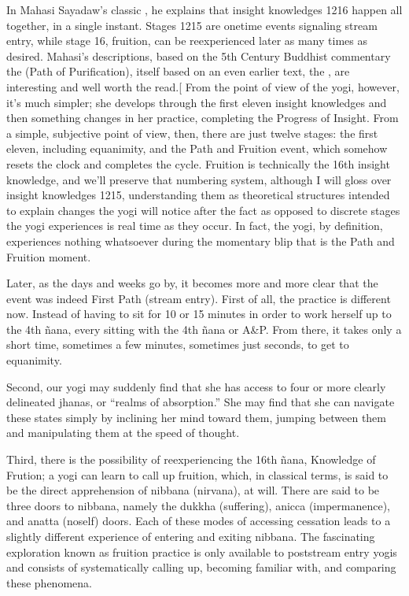 \documentclass[a5paper,10pt,english]{book}
\begin{document}
\sphinxAtStartPar
In Mahasi Sayadaw’s classic , he explains that
insight knowledges 12\sphinxhyphen{}16 happen all together, in a single instant.
Stages 12\sphinxhyphen{}15 are one\sphinxhyphen{}time events signaling stream entry, while stage 16,
fruition, can be re\sphinxhyphen{}experienced later as many times as desired. Mahasi’s
descriptions, based on the 5th Century Buddhist commentary the
 (Path of Purification), itself based on an even earlier
text, the , are interesting and well worth the
read.{[}\sphinxurl{http://www.accesstoinsight.org/lib/authors/mahasi/progress.html\#ch7.17}{]}
From the point of view of the yogi, however, it’s much simpler; she
develops through the first eleven insight knowledges and then something
changes in her practice, completing the Progress of Insight. From a
simple, subjective point of view, then, there are just twelve stages:
the first eleven, including equanimity, and the Path and Fruition event,
which somehow resets the clock and completes the cycle. Fruition is
technically the 16th insight knowledge, and we’ll preserve that
numbering system, although I will gloss over insight knowledges 12\sphinxhyphen{}15,
understanding them as theoretical structures intended to explain changes
the yogi will notice after the fact as opposed to discrete stages the
yogi experiences is real time as they occur. In fact, the yogi, by
definition, experiences nothing whatsoever during the momentary blip
that is the Path and Fruition moment.

\sphinxAtStartPar
Later, as the days and weeks go by, it becomes more and more clear that
the event was indeed First Path (stream entry). First of all, the
practice is different now. Instead of having to sit for 10 or 15 minutes
in order to work herself up to the 4th ñana, every sitting  with
the 4th ñana or A\&P. From there, it takes only a short time, sometimes a
few minutes, sometimes just seconds, to get to equanimity.

\sphinxAtStartPar
Second, our yogi may suddenly find that she has access to four or more
clearly delineated jhanas, or “realms of absorption.” She may find that
she can navigate these states simply by inclining her mind toward them,
jumping between them and manipulating them at the speed of thought.

\sphinxAtStartPar
Third, there is the possibility of re\sphinxhyphen{}experiencing the 16th ñana,
Knowledge of Frution; a yogi can learn to call up fruition, which, in
classical terms, is said to be the direct apprehension of nibbana
(nirvana), at will. There are said to be three doors to nibbana, namely
the dukkha (suffering), anicca (impermanence), and anatta (no\sphinxhyphen{}self)
doors. Each of these modes of accessing cessation leads to a slightly
different experience of entering and exiting nibbana. The fascinating
exploration known as fruition practice is only available to post\sphinxhyphen{}stream
entry yogis and consists of systematically calling up, becoming familiar
with, and comparing these phenomena.
\end{document}
